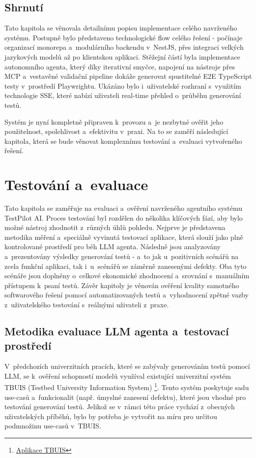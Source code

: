 \documentclass[czech, ing, kiv, he, iso690numb, viewonly]{fasthesis}
\begin{document}
\section{Shrnutí}
Tato kapitola se věnovala detailnímu popisu implementace celého navrženého systému.
Postupně bylo představeno technologické flow celého řešení - počínaje organizací monorepa a~modulárního backendu v~NestJS, přes integraci velkých jazykových modelů až po klientskou aplikaci.
Stěžejní částí byla implementace autonomního agenta, který díky iterativní smyčce, napojení na nástroje 
přes MCP a~vestavěné validační pipeline dokáže generovat spustitelné E2E TypeScript testy v~prostředí Playwrightu.
Ukázáno bylo i~uživatelské rozhraní s~využitím technologie SSE, které nabízí uživateli 
real-time přehled o~průběhu generování testů.

Systém je nyní kompletně připraven k~provozu a~je nezbytné ověřit jeho použitelnost, spolehlivost a~efektivitu v~praxi.
Na to se zaměří následující kapitola, která se bude věnovat komplexnímu testování a~evaluaci vytvořeného řešení.


\chapter{Testování a~evaluace}\label{chapter:testing}
Tato kapitola se zaměřuje na evaluaci a~ověření navrženého agentního systému TestPilot AI.
Proces testování byl rozdělen do několika klíčových fází,
aby bylo možné nástroj zhodnotit z~různých úhlů pohledu.
Nejprve je představena metodika měření a~speciálně vyvinutá testovací aplikace, která slouží 
jako plně kontrolované prostředí pro běh LLM agenta. Následně jsou analyzovány a~prezentovány výsledky generování testů - a~to jak u~pozitivních scénářů na zcela funkční aplikaci,
tak i~u~scénářů se záměrně zanesenými defekty. Oba tyto scénáře jsou doplněny o~celkové ekonomické zhodnocení 
a~srovnání s~manuálním přístupem k~psaní testů. Závěr kapitoly je věnován 
ověření kvality samotného softwarového řešení pomocí automatizovaných testů
 a~vyhodnocení zpětné vazby z~uživatelského testování s~reálnými uživateli z~praxe.

\section{Metodika evaluace LLM agenta a~testovací prostředí}
V~předchozích univerzitních pracích, které se zabývaly generováním testů pomocí LLM,
se k~ověření schopností modelů využíval existující univerzitní systém TBUIS (Testbed University Information System)
\footnote{\href{https://projects.kiv.zcu.cz/tbuis/web/}{Aplikace TBUIS}}.
Tento systém poskytuje sadu use-casů a~funkcionalit (např. úmyslné zanesení defektu),
které jsou vhodné pro testování generování testů. Jelikož se v~rámci této 
práce vychází z~obecných uživatelských příběhů, bylo by potřeba je vytvořit na míru 
pro určitou podmnožinu use-casů v~TBUIS.
\end{document}
